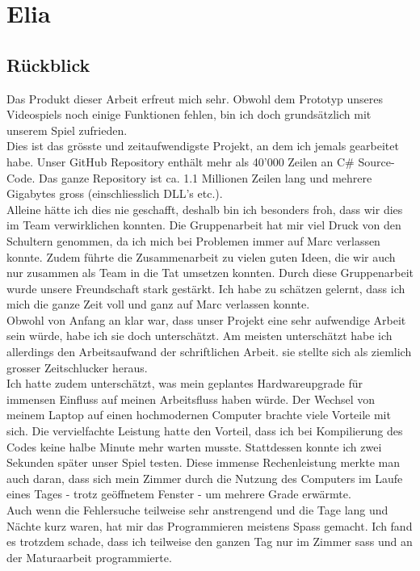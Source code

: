 \chapter{Elia}

\section{Rückblick}
Das Produkt dieser Arbeit erfreut mich sehr. Obwohl dem Prototyp unseres Videospiels noch einige Funktionen fehlen, bin ich doch grundsätzlich mit unserem Spiel zufrieden. \\
Dies ist das grösste und zeitaufwendigste Projekt, an dem ich jemals gearbeitet habe. Unser GitHub Repository enthält mehr als 40'000 Zeilen an C\# Source-Code.
Das ganze Repository ist ca. 1.1 Millionen Zeilen lang und mehrere Gigabytes gross (einschliesslich DLL's etc.). \\
Alleine hätte ich dies nie geschafft, deshalb bin ich besonders froh, dass wir dies im Team verwirklichen konnten. Die Gruppenarbeit hat mir viel Druck von den Schultern genommen, da ich mich bei Problemen immer auf Marc
verlassen konnte. Zudem führte die Zusammenarbeit zu vielen guten Ideen, die wir auch nur zusammen als Team in die Tat umsetzen konnten. Durch diese Gruppenarbeit wurde unsere Freundschaft stark gestärkt.
Ich habe zu schätzen gelernt, dass ich mich die ganze Zeit voll und ganz auf Marc verlassen konnte.\\
Obwohl von Anfang an klar war, dass unser Projekt eine sehr aufwendige Arbeit sein würde, habe ich sie doch unterschätzt. Am meisten unterschätzt habe ich allerdings den Arbeitsaufwand der schriftlichen Arbeit. sie stellte sich als ziemlich grosser Zeitschlucker heraus. \\
Ich hatte zudem unterschätzt, was mein geplantes Hardwareupgrade für immensen Einfluss auf meinen Arbeitsfluss haben würde. Der Wechsel von meinem Laptop auf einen hochmodernen Computer brachte viele Vorteile mit sich.
Die vervielfachte Leistung hatte den Vorteil, dass ich bei Kompilierung des Codes keine halbe Minute mehr warten musste. Stattdessen konnte ich zwei Sekunden später unser Spiel testen.
Diese immense Rechenleistung merkte man auch daran, dass sich mein Zimmer durch die Nutzung des Computers im Laufe eines Tages - trotz geöffnetem Fenster - um mehrere Grade erwärmte.\\
Auch wenn die Fehlersuche teilweise sehr anstrengend und die Tage lang und Nächte kurz waren, hat mir das Programmieren meistens Spass gemacht. Ich fand es trotzdem schade,
dass ich teilweise den ganzen Tag nur im Zimmer sass und an der Maturaarbeit programmierte. 

